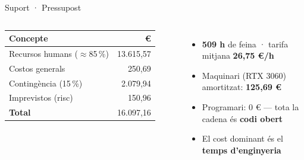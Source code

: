 \documentclass[aspectratio=169,10pt]{beamer}
\newcommand{\stat}[1]{{\AdwaitaHeavy\color{ink}#1}}
\begin{document}
\begin{frame}{Suport · Pressupost}
  \vspace{0.2em}
  \begin{columns}[T]
    \centering
    {\renewcommand{\arraystretch}{1.35}\small
    \begin{tabular}{@{}l r@{}}
      \toprule
      \textbf{Concepte} & \textbf{€} \\
      \midrule
      Recursos humans ($\approx$85\,\%) & 13.615,57 \\
      Costos generals                   & 250,69 \\
      Contingència (15\,\%)             & 2.079,94 \\
      Imprevistos (risc)                & 150,96 \\
      \midrule
      \textbf{Total}                    & \stat{16.097,16} \\
      \bottomrule
    \end{tabular}}

    \begin{itemize}\setlength\itemsep{0.5em}
      \item \textbf{509 h} de feina · tarifa mitjana \textbf{26,75 €/h}
      \item Maquinari (RTX 3060) amortitzat: \textbf{125,69 €}
      \item Programari: \stat{0 €} — tota la cadena és \textbf{codi obert}
      \item El cost dominant és el \textbf{temps d'enginyeria}
    \end{itemize}
  \end{columns}
\end{frame}
\end{document}
